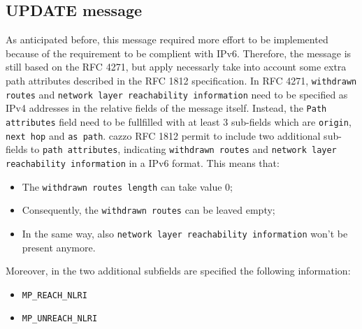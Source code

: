 \subsection{UPDATE message}
As anticipated before, this message required more effort to be implemented because of the requirement to be complient with IPv6. Therefore, the message is still based on the RFC 4271\cite{rfc4271}, but apply necessarly take into account some extra path attributes described in the RFC 1812 specification\cite{rfc1812}.
In RFC 4271, \texttt{withdrawn routes} and \texttt{network layer reachability information} need to be specified as IPv4 addresses in the relative fields of the message itself. Instead, the \texttt{Path attributes} field need to be fullfilled with at least 3 sub-fields which are \texttt{origin}, \texttt{next hop} and \texttt{as path}.
cazzo
RFC 1812 permit to include two additional sub-fields to \texttt{path attributes}, indicating \texttt{withdrawn routes} and \texttt{network layer reachability information} in a IPv6 format.
This means that:
\begin{itemize}
    \item The \texttt{withdrawn routes length} can take value 0;
    \item Consequently, the \texttt{withdrawn routes} can be leaved empty;
    \item In the same way, also \texttt{network layer reachability information} won't be present anymore.
\end{itemize}
Moreover, in the two additional subfields are specified the following information:
\begin{itemize}
    \item \texttt{MP\_REACH\_NLRI}
    \item \texttt{MP\_UNREACH\_NLRI}
\end{itemize}
